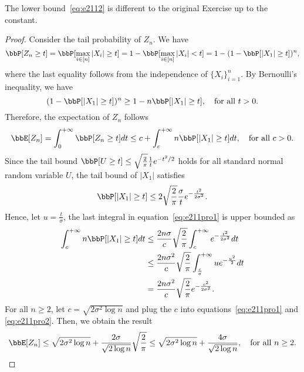 \documentclass[11pt]{article}
\theoremstyle{plain}
\theoremstyle{definition}
\begin{document}
The lower bound~\eqref{eq:e2112} is different to the original Exercise up to the constant.

\begin{proof}
	
	\vspace{0.2cm}
	Consider the tail probability of $Z_n$. We have
	\begin{equation}
		\bbP[Z_n \geq t] = \bbP[\max_{i \in [n]} |X_i| \geq t] = 1 - \bbP[\max_{i \in [n]} |X_i| < t] = 1 - (1- \bbP[|X_1| \geq t])^n,
	\end{equation}
	where the last equality follows from the independence of $\{X_i\}_{i=1}^n$. By Bernoulli's inequality, we have
	\begin{equation}
		(1- \bbP[|X_1| \geq t])^n \geq 1 - n \bbP[|X_1| \geq t], \quad \text{for all } t >0.
	\end{equation} 
	Therefore, the expectation of $Z_n$ follows
	\begin{equation}\label{eq:e211pro1}
		\bbE[Z_n] = \int_{0}^{+\infty} \bbP[Z_n \geq t] dt \leq  c +  \int_{c}^{+\infty} n\bbP[|X_1| \geq t] dt, \quad \text{for all } c > 0.
	\end{equation}
	 Since the tail bound $\bbP[U \geq t] \leq \sqrt{\frac{2}{\pi}} \frac{1}{t} e^{-t^2 /2}$ holds for all standard normal random variable $U$, the tail bound of $|X_1|$ satisfies
	 \begin{equation}\label{eq:e211proupper}
	 	\bbP[|X_1| \geq t] \leq 2 \sqrt{\frac{2}{\pi}} \frac{\sigma}{t} e^{-\frac{t^2}{2\sigma^2}}.
	 \end{equation}
	 Hence, let $ u = \frac{ t}{\sigma}$, the last integral in equation~\eqref{eq:e211pro1} is upper bounded as
	 \begin{align}
	 	 \int_{c}^{+\infty} n\bbP[|X_1| \geq t] dt &\leq \frac{2n \sigma}{c} \sqrt{\frac{2}{\pi}} \int_{c}^{+\infty} e^{-\frac{t^2}{2\sigma^2} }dt \\  
	 	 & \leq \frac{2n \sigma^2}{c} \sqrt{\frac{2}{\pi}}   \int_{\frac{c}{\sigma}}^{+\infty} u e^{-\frac{u^2}{2}} dt \\
	 	 & = \frac{2n \sigma^2}{c} \sqrt{\frac{2}{\pi}}  e^{-\frac{c^2}{2\sigma^2}}. \label{eq:e211pro2}
	 \end{align}
	 For all $n \geq 2$, let $c = \sqrt{2\sigma^2 \log n}$ and plug the $c$ into equations~\eqref{eq:e211pro1} and \eqref{eq:e211pro2}. Then, we obtain the result
	 \begin{equation}
	 	\bbE[Z_n] \leq \sqrt{2\sigma^2 \log n} + \frac{2\sigma}{\sqrt{2\log n}}   \sqrt{\frac{2}{\pi}}  \leq \sqrt{2\sigma^2 \log n} + \frac{4\sigma}{\sqrt{2\log n}}, \quad \text{for all }n \geq 2.
	 \end{equation}
	 

\end{proof}
\end{document}
